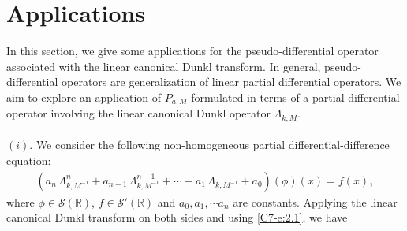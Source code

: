 \documentclass[12pt,a4paper,reqno]{amsproc}
\theoremstyle{definition}
\theoremstyle{remark}
\numberwithin{equation}{section}
\begin{document}
\section{Applications} \label{C7-S4}
In this section, we give some applications for the pseudo-differential operator associated with the linear canonical Dunkl transform. In general, pseudo-differential operators are generalization of linear partial differential operators. 
We aim to explore an application of $P_{a,M}$ formulated in terms of a partial differential operator involving the linear canonical Dunkl operator $\Lambda_{k,M}$. \\\\
$(i).$ We consider the following non-homogeneous partial differential-difference equation:
\begin{eqnarray*}
  (a_n\,\Lambda_{k,M^{-1}}^n+a_{n-1}\,\Lambda_{k,M^{-1}}^{n-1}+\cdots +a_1\,\Lambda_{k,M^{-1}}+a_0 )(\phi)(x) =f(x),
\end{eqnarray*}
where $\phi \in \mathcal{S}(\mathbb{R})$,  $f\in\mathcal{S}'(\mathbb{R})$ and $a_0,a_1, \cdots a_n$ are constants. Applying the linear canonical Dunkl transform on both sides and using \eqref{C7-e:2.1}, we have
\end{document}
